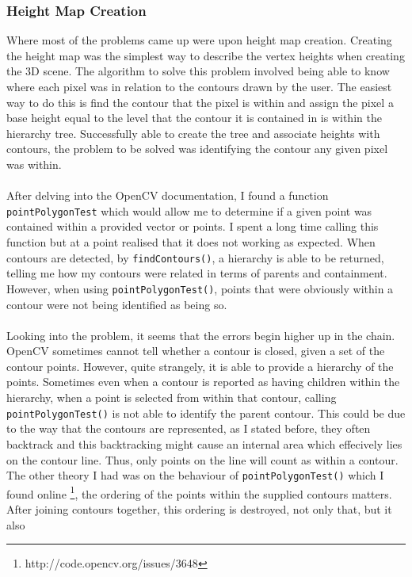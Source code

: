 \documentclass[11pt]{article}
\begin{document}
\subsubsection{Height Map Creation}
Where most of the problems came up were upon height map creation. 
Creating the height map was the simplest way to 
describe the vertex heights when creating the 3D scene. The algorithm to
solve this problem involved being able to know where each pixel was in 
relation to the contours drawn by the user. The easiest way to do this is
find the contour that the pixel is within and assign the pixel a base
height equal to the level that the contour it is contained in is within
the hierarchy tree. Successfully able to create the tree and 
associate heights with contours, the problem to be solved was
identifying the contour any given pixel was within.\\
\\
After delving into the OpenCV documentation, I found a function
\texttt{pointPolygonTest} which would allow me to determine if a given
point was contained within a provided vector or points. 
I spent a long time calling this function 
but at a point realised that it does not working as expected.
When contours are detected, by \texttt{findContours()}, a hierarchy
is able to be returned, telling me how my contours were related in terms
of parents and containment. However, when using \texttt{pointPolygonTest()},
points that were obviously within a contour were not being identified
as being so. \\
\\
Looking into the problem, it seems that the errors begin higher up in the 
chain. OpenCV sometimes cannot tell whether a contour is closed, given a
set of the contour points. However, quite strangely, it is able to provide
a hierarchy of the points. Sometimes even when a contour is reported
as having children within the hierarchy, when a point is selected from within
that contour, calling \texttt{pointPolygonTest()} is not able to identify
the parent contour. This could be due to the way that the contours are
represented, as I stated before, they often backtrack and this backtracking
might cause an internal area which effecively lies on the contour line. Thus,
only points on the line will count as within a contour. The other theory
I had was on the behaviour of \texttt{pointPolygonTest()} which I found
online \footnote{http://code.opencv.org/issues/3648}, 
the ordering of the points within the supplied contours matters. After joining
contours together, this ordering is destroyed, not only that, but it also
\end{document}
